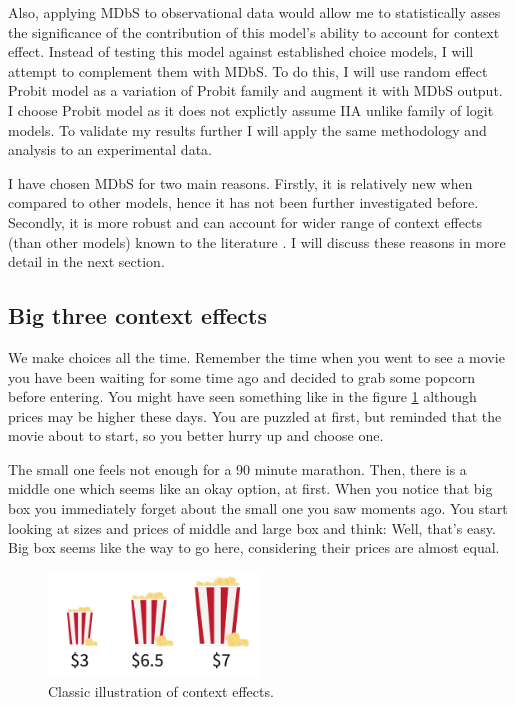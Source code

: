 \documentclass[a4paper,12pt]{article}
\begin{document}
Also, applying MDbS to observational data would allow me to statistically asses the significance of the contribution of this model's ability to account for context effect. Instead of testing this model against established choice models, I will attempt to complement them with MDbS. To do this, I will use random effect Probit model as a variation of Probit family and augment it with MDbS output. I choose Probit model as it does not explictly assume IIA unlike family of logit models. To validate my results further I will apply the same methodology and analysis to an experimental data.

I have chosen MDbS for two main reasons. Firstly, it is relatively new when compared to other models, hence it has not been further investigated before. Secondly, it is more robust and can account for wider range of context effects (than other models) known to the literature \citep{noguchi2018multialternative}. I will discuss these reasons in more detail in the next section. 


\subsection{Big three context effects}

We make choices all the time. Remember the time when you went to see a movie you have been waiting for some time ago and decided to grab some popcorn before entering. You might have seen something like in the figure \ref{fig:decoyPopcornExample}  although prices may be higher these days. You are puzzled at first, but reminded that the movie about to start, so you better hurry up and choose one. 

The small one feels not enough for a 90 minute marathon. Then, there is a middle one which seems like an okay option,  at first. When you notice that big box you immediately forget about the small one you saw moments ago. You start looking at sizes and prices of middle and large box and think: Well, that's easy. Big box seems like the way to go here, considering their prices are almost equal. 


\begin{figure}[H]
    \centering
    \includegraphics[width=0.5\textwidth]{staticFiles/popcornDecoy.png}
    \caption{Classic illustration of context effects.}
    \label{fig:decoyPopcornExample}
\end{figure}
\end{document}
